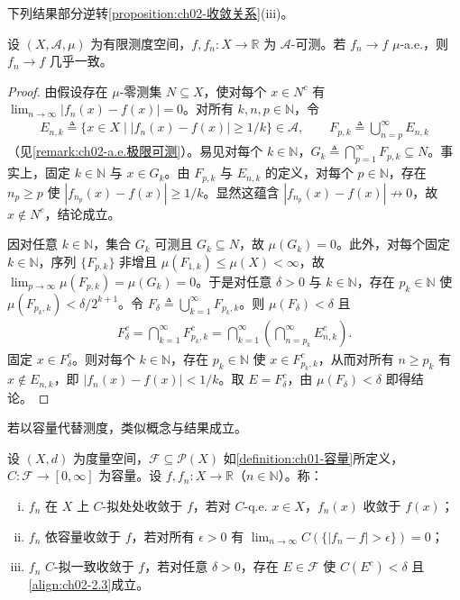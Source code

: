 \documentclass[../../main.tex]{subfiles}%
\begin{document}
下列结果部分逆转\cref{proposition:ch02-收敛关系}(iii)。

\begin{theorem}[Egorov]\label{theorem:ch02-Egorov}
设 $(X,\mathscr A,\mu)$ 为有限测度空间，$f,f_n:X\to\mathbb R$ 为 $\mathscr A$-可测。若 $f_n\to f$ $\mu$-a.e.，则 $f_n\to f$ 几乎一致。
\end{theorem}

\begin{proof}
由假设存在 $\mu$-零测集 $N\subseteq X$，使对每个 $x\in N^c$ 有 $\lim_{n\to\infty}|f_n(x)-f(x)|=0$。对所有 $k,n,p\in\mathbb N$，令
\begin{align*}
E_{n,k}\triangleq \{x\in X\mid|f_n(x)-f(x)|\geqslant 1/k\}\in\mathscr A,\qquad
F_{p,k}\triangleq \bigcup_{n=p}^\infty E_{n,k}
\end{align*}
（见\cref{remark:ch02-a.e.极限可测}）。易见对每个 $k\in\mathbb N$，$G_k\triangleq \bigcap_{p=1}^\infty F_{p,k}\subseteq N$。事实上，固定 $k\in\mathbb N$ 与 $x\in G_k$。由 $F_{p,k}$ 与 $E_{n,k}$ 的定义，对每个 $p\in\mathbb N$，存在 $n_p\geqslant p$ 使 $|f_{n_p}(x)-f(x)|\geqslant 1/k$。显然这蕴含 $|f_{n_p}(x)-f(x)|\not\to0$，故 $x\notin N^c$，结论成立。

因对任意 $k\in\mathbb N$，集合 $G_k$ 可测且 $G_k\subseteq N$，故 $\mu(G_k)=0$。此外，对每个固定 $k\in\mathbb N$，序列 $\{F_{p,k}\}$ 非增且 $\mu(F_{1,k})\leqslant\mu(X)<\infty$，故 $\lim_{p\to\infty}\mu(F_{p,k})=\mu(G_k)=0$。于是对任意 $\delta>0$ 与 $k\in\mathbb N$，存在 $p_k\in\mathbb N$ 使 $\mu(F_{p_k,k})<\delta/2^{k+1}$。令 $F_\delta\triangleq \bigcup_{k=1}^\infty F_{p_k,k}$。则 $\mu(F_\delta)<\delta$ 且
\begin{align*}
F_\delta^c=\bigcap_{k=1}^\infty F_{p_k,k}^c=\bigcap_{k=1}^\infty\left(\bigcap_{n=p_k}^\infty E_{n,k}^c\right).
\end{align*}
固定 $x\in F_\delta^c$。则对每个 $k\in\mathbb N$，存在 $p_k\in\mathbb N$ 使 $x\in F_{p_k,k}^c$，从而对所有 $n\geqslant p_k$ 有 $x\notin E_{n,k}$，即 $|f_n(x)-f(x)|<1/k$。取 $E=F_\delta^c$，由 $\mu(F_\delta)<\delta$ 即得结论。
\end{proof}

若以容量代替测度，类似概念与结果成立。

\begin{definition}\label{definition:ch02-容量收敛}
设 $(X,d)$ 为度量空间，$\mathscr F\subseteq\mathscr P(X)$ 如\cref{definition:ch01-容量}所定义，$C:\mathscr F\to[0,\infty]$ 为容量。设 $f,f_n:X\to\mathbb R$（$n\in\mathbb N$）。称：
\begin{enumerate}[(i)]
\item $f_n$ 在 $X$ 上 $C$-拟处处收敛于 $f$，若对 $C$-q.e. $x\in X$，$f_n(x)$ 收敛于 $f(x)$；
\item $f_n$ 依容量收敛于 $f$，若对所有 $\epsilon>0$ 有 $\lim_{n\to\infty}C(\{|f_n-f|>\epsilon\})=0$；
\item $f_n$ $C$-拟一致收敛于 $f$，若对任意 $\delta>0$，存在 $E\in\mathscr F$ 使 $C(E^c)<\delta$ 且\eqref{align:ch02-2.3}成立。
\end{enumerate}
\end{definition}
\end{document}
